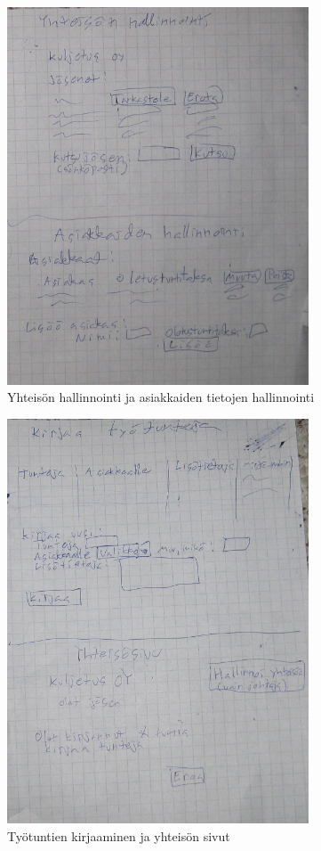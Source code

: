 \documentclass[a4paper, 12pt finnish]{article}
\begin{document}
\begin{figure}[h]
    \centering
    \includegraphics[width=0.8\textwidth]{yhthallinnointi.png}
    \caption{\small Yhteisön hallinnointi ja asiakkaiden tietojen
    hallinnointi}
\end{figure}
\begin{figure}[h]
    \centering
    \includegraphics[width=0.8\textwidth]{kirjaaminen.png}
    \caption{\small Työtuntien kirjaaminen ja yhteisön sivut}
\end{figure}
\end{document}
